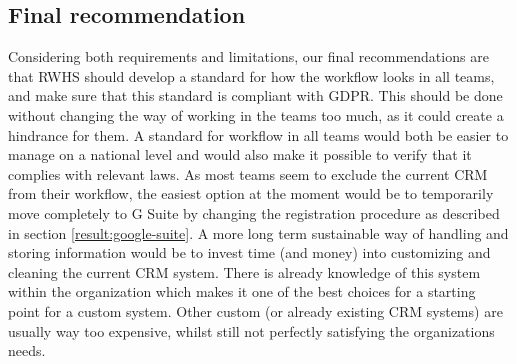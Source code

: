 \subsection{Final recommendation}
Considering both requirements and limitations, our final recommendations are that RWHS should develop a standard for how the workflow looks in all teams, and make sure that this standard is compliant with GDPR. This should be done without changing the way of working in the teams too much, as it could create a hindrance for them. A standard for workflow in all teams would both be easier to manage on a national level and would also make it possible to verify that it complies with relevant laws. As most teams seem to exclude the current CRM from their workflow, the easiest option at the moment would be to temporarily move completely to G Suite by changing the registration procedure as described in section \ref{result:google-suite}. A more long term sustainable way of handling and storing information would be to invest time (and money) into customizing and cleaning the current CRM system. There is already knowledge of this system within the organization which makes it one of the best choices for a starting point for a custom system. Other custom (or already existing CRM systems) are usually way too expensive, whilst still not perfectly satisfying the organizations needs.

